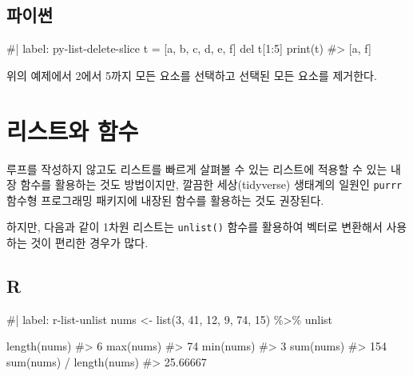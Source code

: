 \documentclass[
  letterpaper,
]{book}
\newenvironment{Shaded}{\begin{snugshade}}{\end{snugshade}}
\newcommand{\NormalTok}[1]{\textcolor[rgb]{0.00,0.23,0.31}{#1}}
\begin{document}
\subsection{파이썬}

\begin{Shaded}
\begin{Highlighting}[]
\NormalTok{\#| label: py{-}list{-}delete{-}slice}
\NormalTok{t = [\textquotesingle{}a\textquotesingle{}, \textquotesingle{}b\textquotesingle{}, \textquotesingle{}c\textquotesingle{}, \textquotesingle{}d\textquotesingle{}, \textquotesingle{}e\textquotesingle{}, \textquotesingle{}f\textquotesingle{}]}
\NormalTok{del t[1:5]}
\NormalTok{print(t)}
\NormalTok{\#\textgreater{} [\textquotesingle{}a\textquotesingle{}, \textquotesingle{}f\textquotesingle{}]}
\end{Highlighting}
\end{Shaded}

위의 예제에서 2에서 5까지 모든 요소를 선택하고 선택된 모든 요소를
제거한다.

\section{리스트와 함수}\label{uxb9acuxc2a4uxd2b8uxc640-uxd568uxc218}

루프를 작성하지 않고도 리스트를 빠르게 살펴볼 수 있는 리스트에 적용할 수
있는 내장 함수를 활용하는 것도 방법이지만, 깔끔한 세상(tidyverse)
생태계의 일원인 \texttt{purrr} 함수형 프로그래밍 패키지에 내장된 함수를
활용하는 것도 권장된다.

하지만, 다음과 같이 1차원 리스트는 \texttt{unlist()} 함수를 활용하여
벡터로 변환해서 사용하는 것이 편리한 경우가 많다.

\subsection{R}

\begin{Shaded}
\begin{Highlighting}[]
\NormalTok{\#| label: r{-}list{-}unlist}
\NormalTok{nums \textless{}{-} list(3, 41, 12, 9, 74, 15) \%\textgreater{}\% unlist}

\NormalTok{length(nums)}
\NormalTok{\#\textgreater{} 6}
\NormalTok{max(nums)}
\NormalTok{\#\textgreater{} 74}
\NormalTok{min(nums)}
\NormalTok{\#\textgreater{} 3}
\NormalTok{sum(nums)}
\NormalTok{\#\textgreater{} 154}
\NormalTok{sum(nums) / length(nums)}
\NormalTok{\#\textgreater{} 25.66667}
\end{Highlighting}
\end{Shaded}
\end{document}
